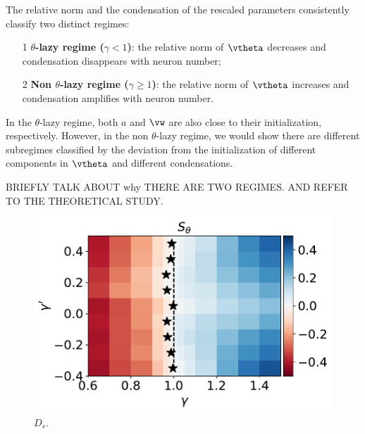 \documentclass{article}
\begin{document}
The relative norm and the condensation of the rescaled parameters consistently classify two distinct regimes:
\begin{itemize}
    \item[1] \textbf{$\theta$-lazy regime ($\gamma<1$)}: the relative norm of $\vtheta$ decreases and condensation disappears with neuron number;
    \item[2] \textbf{Non $\theta$-lazy regime ($\gamma\geq1$)}: the relative norm of $\vtheta$ increases and  condensation amplifies with neuron number.
\end{itemize}

In the $\theta$-lazy regime, both $a$ and $\vw$ are also close to their initialization, respectively. However, in the non $\theta$-lazy regime, we would show there are different subregimes classified by the deviation from the initialization of different components in $\vtheta$ and different condensations.

BRIEFLY TALK ABOUT why THERE ARE TWO REGIMES. AND REFER TO THE THEORETICAL STUDY.

\begin{figure}
    \begin{centering}
        \includegraphics[scale=0.4]{pic/systemexplarg3/scalestudy3/relameansysDrescaleslope.pdf}
        \par\end{centering}
    \caption{$D_{s}$.\label{fig:ds} }
\end{figure}
\end{document}
